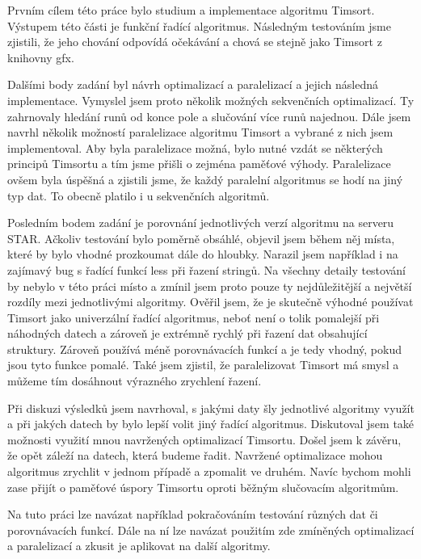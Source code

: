 \documentclass[thesis=B,czech]{FITthesis}[2019/12/23]
\begin{document}
\begin{conclusion}
	Prvním cílem této práce bylo studium a implementace algoritmu Timsort. Výstupem této části je funkční řadící algoritmus. Následným testováním jsme zjistili, že jeho chování odpovídá očekávání a chová se stejně jako Timsort z knihovny gfx.
	
	Dalšími body zadání byl návrh optimalizací a paralelizací a jejich následná implementace. Vymyslel jsem proto několik možných sekvenčních optimalizací. Ty zahrnovaly hledání runů od konce pole a slučování více runů najednou. Dále jsem navrhl několik možností paralelizace algoritmu Timsort a vybrané z nich jsem implementoval. Aby byla paralelizace možná, bylo nutné vzdát se některých principů Timsortu a tím jsme přišli o zejména paměťové výhody. Paralelizace ovšem byla úspěšná a zjistili jsme, že každý paralelní algoritmus se hodí na jiný typ dat. To obecně platilo i u sekvenčních algoritmů.
	
	Posledním bodem zadání je porovnání jednotlivých verzí algoritmu na serveru STAR. Ačkoliv testování bylo poměrně obsáhlé, objevil jsem během něj místa, které by bylo vhodné prozkoumat dále do hloubky. Narazil jsem například i na zajímavý bug s řadící funkcí less při řazení stringů. Na všechny detaily testování by nebylo v této práci místo a zmínil jsem proto pouze ty nejdůležitější a největší rozdíly mezi jednotlivými algoritmy. Ověřil jsem, že je skutečně výhodné používat Timsort jako univerzální řadící algoritmus, neboť není o tolik pomalejší při náhodných datech a zároveň je extrémně rychlý při řazení dat obsahující struktury. Zároveň používá méně porovnávacích funkcí a je tedy vhodný, pokud jsou tyto funkce pomalé. Také jsem zjistil, že paralelizovat Timsort má smysl a můžeme tím dosáhnout výrazného zrychlení řazení.
	
	Při diskuzi výsledků jsem navrhoval, s jakými daty šly jednotlivé algoritmy využít a při jakých datech by bylo lepší volit jiný řadící algoritmus. Diskutoval jsem také možnosti využití mnou navržených optimalizací Timsortu. Došel jsem k závěru, že opět záleží na datech, která budeme řadit. Navržené optimalizace mohou algoritmus zrychlit v jednom případě a zpomalit ve druhém. Navíc bychom mohli zase přijít o paměťové úspory Timsortu oproti běžným slučovacím algoritmům.
	
	Na tuto práci lze navázat například pokračováním testování různých dat či porovnávacích funkcí. Dále na ní lze navázat použitím zde zmíněných optimalizací a paralelizací a zkusit je aplikovat na další algoritmy.
	
\end{conclusion}
\end{document}
